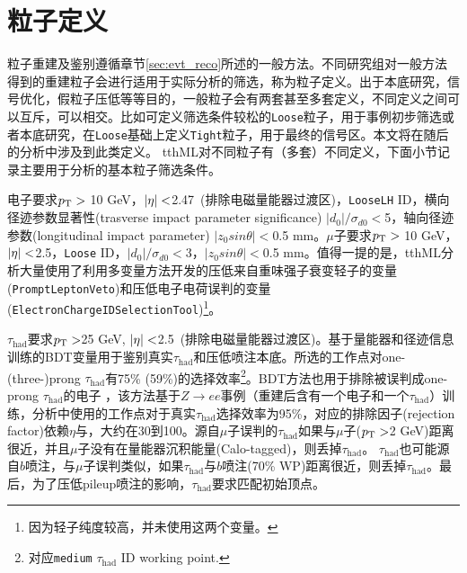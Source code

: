 \section{粒子定义}\label{sec:obj_tth}
粒子重建及鉴别遵循章节\ref{sec:evt_reco}所述的一般方法。不同研究组对一般方法得到的重建粒子会进行适用于实际分析的筛选，称为粒子定义。出于本底研究，信号优化，假粒子压低等等目的，一般粒子会有两套甚至多套定义，不同定义之间可以互斥，可以相交。比如可定义筛选条件较松的\texttt{Loose}粒子，用于事例初步筛选或者本底研究，在\texttt{Loose}基础上定义\texttt{Tight}粒子，用于最终的信号区。本文将在随后的分析中涉及到此类定义。
tthML对不同粒子有（多套）不同定义，下面小节记录主要用于\ltwotau 分析的基本粒子筛选条件。

电子要求$p_{\text{T}} >$ 10 GeV，$|\eta| <$2.47~(排除电磁量能器过渡区)，\texttt{LooseLH} ID，横向径迹参数显著性(trasverse impact parameter significance) $|d_0|/\sigma_{d0}<$5，轴向径迹参数(longitudinal impact parameter) $|z_0sin\theta|<$0.5 mm。$\mu$子要求$p_{\text{T}} >$ 10 GeV，$|\eta| <$2.5，\texttt{Loose} ID，$|d_0|/\sigma_{d0}<$3，$|z_0sin\theta|<$0.5 mm。值得一提的是，tthML分析大量使用了利用多变量方法开发的压低来自重味强子衰变轻子的变量(\texttt{PromptLeptonVeto})和压低电子电荷误判的变量(\texttt{ElectronChargeIDSelectionTool})\footnote{因为\ltwotau 轻子纯度较高，并未使用这两个变量。}。

$\tau_{\text{had}}$要求$p_{\text{T}} >$25 GeV, $|\eta| <$2.5~(排除电磁量能器过渡区)。基于量能器和径迹信息训练的BDT变量用于鉴别真实$\tau_{\text{had}}$和压低喷注本底。所选的工作点对one-(three-)prong $\tau_{\text{had}}$有75\% (59\%)的选择效率\footnote{对应\texttt{medium} $\tau_{\text{had}}$ ID working point.}。BDT方法也用于排除被误判成one-prong $\tau_{\text{had}}$的电子
，该方法基于$Z\rightarrow ee$事例（重建后含有一个电子和一个$\tau_{\text{had}}$）训练，分析中使用的工作点对于真实$\tau_{\text{had}}$选择效率为95\%，对应的排除因子(rejection factor)依赖$\eta$与\pt ，大约在30到100。源自$\mu$子误判的$\tau_{\text{had}}$如果与$\mu$子($p_{\text{T}} >$2 GeV)距离很近，并且$\mu$子没有在量能器沉积能量(Calo-tagged)，则丢掉$\tau_{\text{had}}$。
$\tau_{\text{had}}$也可能源自$b$喷注，与$\mu$子误判类似，如果$\tau_{\text{had}}$与$b$喷注(70\% WP)距离很近，则丢掉$\tau_{\text{had}}$。最后，为了压低pileup喷注的影响，$\tau_{\text{had}}$要求匹配初始顶点。


